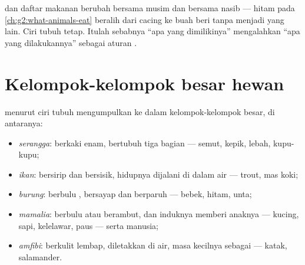 \begin{remark}\label{rem:g3:sorting-living-things:why}
 dan daftar makanan berubah bersama musim dan bersama nasib ---
 hitam pada \cref{ch:g2:what-animals-eat} beralih dari cacing ke
buah beri tanpa menjadi  yang lain. Ciri tubuh tetap. Itulah
sebabnya ``apa yang dimilikinya'' mengalahkan ``apa yang
dilakukannya'' sebagai aturan .
\end{remark}

\section{Kelompok-kelompok besar hewan}

\begin{proposition}\label{prop:g3:sorting-living-things:groups}
 menurut ciri tubuh mengumpulkan  ke dalam
kelompok-kelompok besar, di antaranya:
\begin{itemize}
  \item \emph{serangga}: berkaki enam, bertubuh tiga
        bagian --- semut, kepik, lebah, kupu-kupu;
  \item \emph{ikan}: bersirip dan bersisik, hidupnya
        dijalani di dalam air ---  trout,  mas koki;
  \item \emph{burung}: berbulu , bersayap dan
        berparuh --- bebek,  hitam,  unta;
  \item \emph{mamalia}: berbulu atau berambut, dan
        induknya memberi anaknya  --- kucing, sapi, kelelawar,
        paus --- serta manusia;
  \item \emph{amfibi}: berkulit lembap, 
        diletakkan di air, masa kecilnya sebagai  --- katak,
        salamander.
\end{itemize}
\end{proposition}
\admitted


